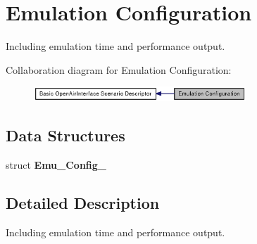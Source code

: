 \section{Emulation Configuration}
\label{group____emu__config}
Including emulation time and performance output.  




Collaboration diagram for Emulation Configuration:\nopagebreak
\begin{figure}[H]
\begin{center}
\leavevmode
\includegraphics[width=226pt]{group____emu__config}
\end{center}
\end{figure}
\subsection*{Data Structures}
\begin{CompactItemize}
\item 
struct {\bf Emu\_\-Config\_\-}
\end{CompactItemize}


\subsection{Detailed Description}
Including emulation time and performance output. 